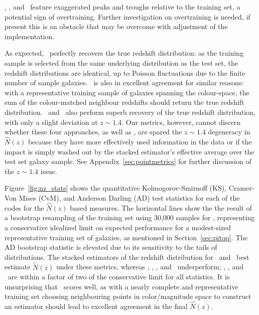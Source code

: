 \annz, \gpz, and \metaphor\ feature exaggerated peaks and troughs relative to the training set, a potential sign of overtraining.
Further investigation on overtraining is needed, if present this is an obstacle that may be overcome with adjustment of the implementation.

As expected, \trainz\ perfectly recovers the true redshift distribution: as the training sample is selected from the same underlying distribution as the test set, the redshift distributions are identical, up to Poisson fluctuations due to the finite number of sample galaxies.
\cmnn\ is also in excellent agreement for similar reasons: with a representative training sample of galaxies spanning the colour-space, the sum of the colour-matched neighbour redshifts should return the true redshift distribution.
\flexzboost\ and \tpz\ also perform superb recovery of the true redshift distribution, with only a slight deviation at $z \sim 1.4$.
Our metrics, however, cannot discern whether these four approaches, as well as \delight, are spared the $z \sim 1.4$ degeneracy in $\hat{N}(z)$ because they have more effectively used information in the data or if the impact is simply washed out by the stacked estimator's effective average over the test set galaxy sample.
See Appendix~\ref{sec:pointmetrics} for further discussion of the $z \sim 1.4$ issue.

Figure~\ref{fig:nz_stats} shows the quantitative Kolmogorov-Smirnoff (KS), Cramer-Von Mises (CvM), and Anderson Darling (AD) test statistics for each of the codes for the $\hat{N}(z)$ based measures.
The horizontal lines show the the result of a bootstrap resampling of the training set using 30,000 samples for \trainz, representing a conservative idealized limit on expected performance for a modest-sized representative training set of galaxies, as mentioned in Section~\ref{sec:pitqq}.
The AD bootstrap statistic is elevated due to its sensitivity to the tails of distributions.
The stacked estimators of the redshift distribution for \cmnn\ and \trainz\ best estimate $\tilde{N}(z)$ under these metrics, whereas \eazy, \lephare, \metaphor, and \skynet\ underperform; \bpz, \gpz, and \tpz\ are within a factor of two of the conservative limit for all statistics.
It is unsurprising that \cmnn\ scores well, as with a nearly complete and representative training set choosing neighbouring points in color/magnitude space to construct an estimator should lead to excellent agreement in the final $\hat{N}(z)$.

